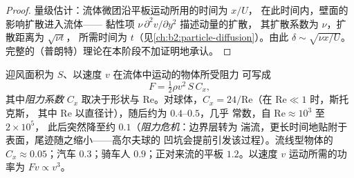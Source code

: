 \begin{proof}
量级估计：流体微团沿平板运动所用的时间为 $x/U$，
在此时间内，壁面的影响扩散进入流体——
黏性项 $\nu\,\partial^2v/\partial y^2$ 描述动量的扩散，
其扩散系数为 $\nu$，扩散距离为 $\sqrt{\nu t}$，
所需时间为 $t$（见\cref{ch:b2:particle-diffusion}）。由此 $\delta \sim \sqrt{\nu x
/U}$。完整的（普朗特）理论在本阶段不加证明地承认。
\end{proof}

\begin{proposition}[高雷诺数下的阻力]\label{prop:b2:viscous-flows:drag}
迎风面积为 $S$、以速度 $v$ 在流体中运动的物体所受阻力
可写成
\[
F = \tfrac12\rho v^2\,S\,C_x ,
\]
其中\emph{阻力系数} $C_x$ 取决于形状与
$\mathrm{Re}$。对球体，$C_x = 24/\mathrm{Re}$（在 $\mathrm{Re} \ll 1$ 时，斯托克斯，
其中 $\mathrm{Re}$ 以直径计），随后约为 $0.4$--$0.5$，几乎
常数，自 $\mathrm{Re} \approx 10^3$ 至 $2 \times 10^5$，
此后突然降至约 $0.1$（\emph{阻力危机}：边界层转为
湍流，更长时间地贴附于表面，尾迹随之缩小——高尔夫球的
凹坑会提前引发该过程）。流线型物体的
$C_x \approx 0.05$；汽车 $0.3$；骑车人 $0.9$；正对来流的平板
$1.2$。以速度 $v$ 运动所需的功率为 $Fv \propto v^3$。
\end{proposition}
\admitted

